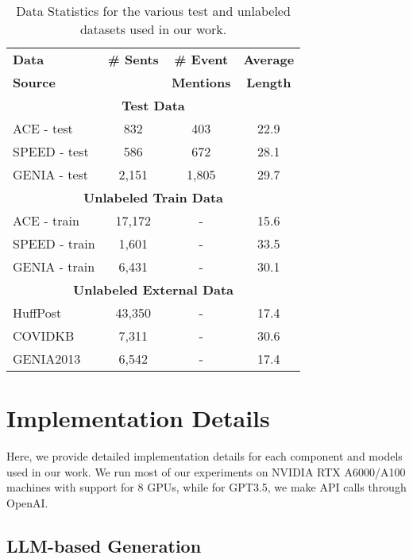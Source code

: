 \begin{table}[h]
    \centering
    \small
    \begin{tabular}{lccc}
        \toprule
        \textbf{Data} & \textbf{\# Sents} & \textbf{\# Event} & \textbf{Average} \\
        \textbf{Source} & & \textbf{Mentions} & \textbf{Length} \\
        \midrule
        \multicolumn{4}{c}{\textbf{Test Data}} \\
        \midrule
        ACE - test & 832 & 403 & 22.9 \\
        SPEED - test & 586 & 672 & 28.1 \\
        GENIA - test & 2,151 & 1,805 & 29.7 \\
        \midrule
        \multicolumn{4}{c}{\textbf{Unlabeled Train Data}} \\
        \midrule
        ACE - train & 17,172 & - & 15.6 \\
        SPEED - train & 1,601 & - & 33.5 \\
        GENIA - train & 6,431 & - & 30.1 \\
        \midrule
        \multicolumn{4}{c}{\textbf{Unlabeled External Data}} \\
        \midrule
        HuffPost & 43,350 & - & 17.4 \\
        COVIDKB & 7,311 & - & 30.6 \\
        GENIA2013 & 6,542 & - & 17.4 \\
        \bottomrule
    \end{tabular}
    \caption{Data Statistics for the various test and unlabeled datasets used in our work.}
    \label{tab:data-statistics}
\end{table}

\section{Implementation Details}
\label{sec:appendix-implementation-details}

Here, we provide detailed implementation details for each component and models used in our work.
We run most of our experiments on NVIDIA RTX A6000/A100 machines with support for 8 GPUs, while for GPT3.5, we make API calls through OpenAI.

\subsection{LLM-based Generation}

